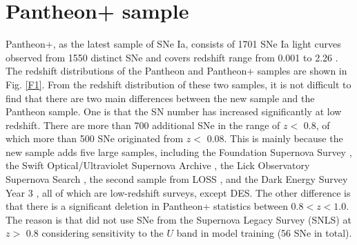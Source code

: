 \documentclass{aa}
\begin{document}
\section{Pantheon+ sample}\label{sec:data} 
Pantheon+, as the latest sample of SNe Ia, consists of 1701 SNe Ia light curves observed from 1550 distinct SNe and covers redshift range from 0.001 to 2.26 \citep{2022ApJ...938..110B,2022ApJ...938..113S}. %
The redshift distributions of the Pantheon \citep{2018ApJ...859..101S} and Pantheon+ samples are shown in Fig. \ref{F1}. From the redshift distribution of these two samples, it is not difficult to find that there are two main differences between the new sample and the Pantheon sample. One is that the SN number has increased significantly at low redshift. There are more than 700 additional SNe in the range of $z <$ 0.8, of which more than 500 SNe originated from $z <$ 0.08. This is mainly because the new sample adds five large samples, including the Foundation Supernova Survey \citep[Foundation;][]{2018MNRAS.475..193F}, the Swift Optical/Ultraviolet Supernova Archive \citep[SOUSA;][]{2014Ap&SS.354...89B}, the Lick Observatory Supernova Search \citep[LOSS1;][]{2010ApJS..190..418G}, the second sample from LOSS \citep[LOSS2;][]{2019MNRAS.490.3882S}, and the Dark Energy Survey Year 3  \citep[DES;][]{2019ApJ...874..106B,2020AJ....160..267S}, all of which are low-redshift surveys, except DES. The other difference is that there is a significant deletion in Pantheon+ statistics between $0.8 < z < 1.0$. The reason is that \citet{2022ApJ...938..113S} did not use SNe from the Supernova Legacy Survey (SNLS) at $z >$ 0.8 considering sensitivity to the $U$ band in model training (56 SNe in total). 
\end{document}
